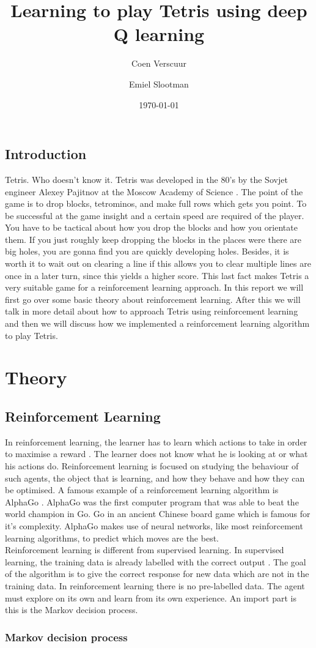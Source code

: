 \documentclass{report}
\title{Learning to play Tetris using deep Q learning}
\author{Coen Verscuur \and Emiel Slootman}
\date{\today}
\begin{document}
\maketitle


\section{Introduction}
Tetris. Who doesn't know it. Tetris was developed in the 80's by the Sovjet engineer Alexey Pajitnov at the Moscow Academy of Science \cite{tet}. The point of the game is to drop blocks, tetrominos, and make full rows which gets you point. To be successful at the game insight and a certain speed are required of the player. You have to be tactical about how you drop the blocks and how you orientate them. If you just roughly keep dropping the blocks in the places were there are big holes, you are gonna find you are quickly developing holes. Besides, it is worth it to wait out on clearing a line if this allows you to clear multiple lines are once in a later turn, since this yields a higher score. This last fact makes Tetris a very suitable game for a reinforcement learning approach.
In this report we will first go over some basic theory about reinforcement learning. After this we will talk in more detail about how to approach Tetris using reinforcement learning and then we will discuss how we implemented a reinforcement learning algorithm to play Tetris.

\tableofcontents

\chapter{Theory}
\section{Reinforcement Learning}
In reinforcement learning, the learner has to learn which actions to take in order to maximise a reward \cite[1]{Sutton2018}. The learner does not know what he is looking at or what his actions do. Reinforcement learning is focused on studying the behaviour of such agents, the object that is learning, and how they behave and how they can be optimised. A famous example of a reinforcement learning algorithm is AlphaGo \cite{alphago}. AlphaGo was the first computer program that was able to beat the world champion in Go. Go in an ancient Chinese board game which is famous for it's complexity. AlphaGo makes use of neural networks, like most reinforcement learning algorithms, to predict which moves are the best.\\
Reinforcement learning is different from supervised learning. In supervised learning, the training data is already labelled with the correct output \cite[2]{Sutton2018}. The goal of the algorithm is to give the correct response for new data which are not in the training data. In reinforcement learning there is no pre-labelled data. The agent must explore on its own and learn from its own experience. An import part is this is the Markov decision process.

\subsection{Markov decision process}


\printbibliography[heading=bibintoc,title={References}]
\end{document}
